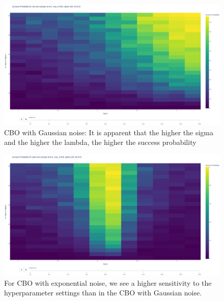 \documentclass[a4paper, 11pt]{article}
\begin{document}
\begin{figure}[!ht]
\centering
\includegraphics[width=1\textwidth]{imgs/cbo_n_sigma_lambda.png}

\caption{CBO with Gaussian noise: It is apparent that the higher the sigma and the higher the lambda, the higher the success probability} \vspace{-1em}
\label{fig:cbo_n_sigma_lambda}
\end{figure}
\begin{figure}[!ht]
\centering
\includegraphics[width=1\textwidth]{imgs/qcbo_n_sigma_lambda.png}

\caption{For CBO with exponential noise, we see a higher sensitivity to the hyperparameter settings than in the CBO with Gaussian noise.} \vspace{-1em}
\label{fig:qcbo_n_sigma_lambda}
\end{figure}


\end{document}
